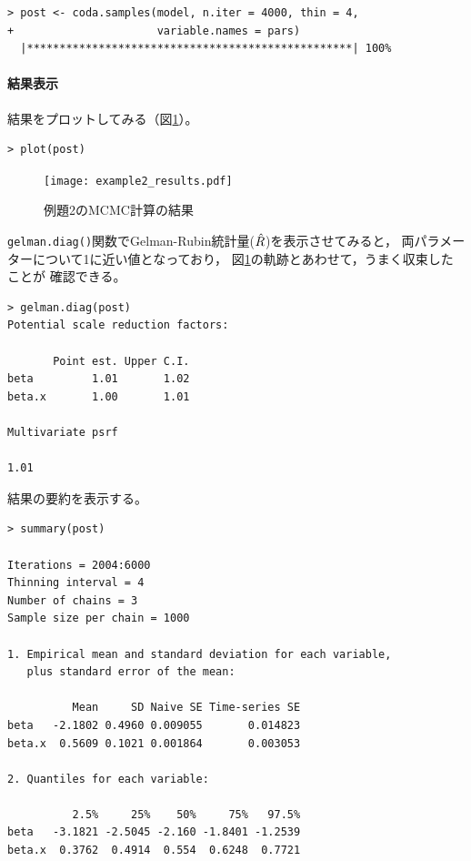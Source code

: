 \documentclass[11pt,uplatex]{jsarticle}
\begin{document}
\vspace{1.5cm}

\begin{lstlisting}
> post <- coda.samples(model, n.iter = 4000, thin = 4,
+                      variable.names = pars)
  |**************************************************| 100%
\end{lstlisting}


\paragraph{結果表示}

結果をプロットしてみる（図\ref{plot_coda}）。
\begin{lstlisting}
> plot(post)
\end{lstlisting}


\begin{figure}[htbp]
	\begin{center}
		\texttt{[image: example2\_results.pdf]}
	\end{center}
	\caption{例題2のMCMC計算の結果}
	\label{plot_coda}
\end{figure}


\texttt{gelman.diag()}関数でGelman-Rubin統計量($\Hat{R}$)を表示させてみると，
両パラメーターについて1に近い値となっており，
図\ref{plot_coda}の軌跡とあわせて，うまく収束したことが
確認できる。
\begin{lstlisting}
> gelman.diag(post)
Potential scale reduction factors:

       Point est. Upper C.I.
beta         1.01       1.02
beta.x       1.00       1.01

Multivariate psrf

1.01
\end{lstlisting}


結果の要約を表示する。
\begin{lstlisting}
> summary(post)

Iterations = 2004:6000
Thinning interval = 4 
Number of chains = 3 
Sample size per chain = 1000 

1. Empirical mean and standard deviation for each variable,
   plus standard error of the mean:

          Mean     SD Naive SE Time-series SE
beta   -2.1802 0.4960 0.009055       0.014823
beta.x  0.5609 0.1021 0.001864       0.003053

2. Quantiles for each variable:

          2.5%     25%    50%     75%   97.5%
beta   -3.1821 -2.5045 -2.160 -1.8401 -1.2539
beta.x  0.3762  0.4914  0.554  0.6248  0.7721

\end{lstlisting}
\end{document}
